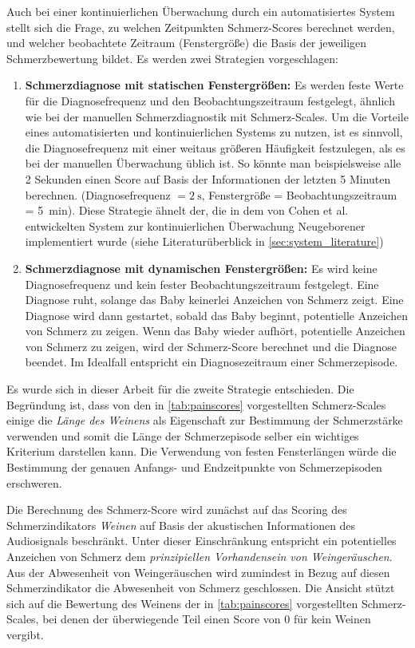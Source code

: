 Auch bei einer kontinuierlichen Überwachung durch ein automatisiertes System stellt sich die Frage, zu welchen Zeitpunkten Schmerz-Scores berechnet werden, und welcher beobachtete Zeitraum (\glqq Fenstergröße\grqq ) die Basis der jeweiligen Schmerzbewertung bildet. Es werden zwei Strategien vorgeschlagen:
\begin{enumerate}
\item \textbf{Schmerzdiagnose mit statischen Fenstergrößen: } Es werden feste Werte für die Diagnosefrequenz und den Beobachtungszeitraum festgelegt, ähnlich wie bei der manuellen Schmerzdiagnostik mit Schmerz-Scales. Um die Vorteile eines automatisierten und kontinuierlichen Systems zu nutzen, ist es sinnvoll, die Diagnosefrequenz mit einer weitaus größeren Häufigkeit festzulegen, als es bei der manuellen Überwachung üblich ist. So könnte man beispielsweise alle 2 Sekunden einen Score auf Basis der Informationen der letzten 5 Minuten berechnen. (Diagnosefrequenz $ = \SI{2}{\second}$, Fenstergröße = Beobachtungszeitraum = \SI{5}{\minute}). Diese Strategie ähnelt der, die in dem von Cohen et al. \cite{cohenCry} entwickelten System zur kontinuierlichen Überwachung Neugeborener implementiert wurde (siehe Literaturüberblick in \autoref{sec:system_literature})
\item \textbf{Schmerzdiagnose mit dynamischen Fenstergrößen: } Es wird keine Diagnosefrequenz und kein fester Beobachtungszeitraum festgelegt. Eine Diagnose ruht, solange das Baby keinerlei Anzeichen von Schmerz zeigt. Eine Diagnose wird dann gestartet, sobald das Baby beginnt, potentielle Anzeichen von Schmerz zu zeigen. Wenn das Baby wieder aufhört, potentielle Anzeichen von Schmerz zu zeigen, wird der Schmerz-Score berechnet und die Diagnose beendet. Im Idealfall entspricht ein Diagnosezeitraum einer Schmerzepisode.
\end{enumerate}

Es wurde sich in dieser Arbeit für die zweite Strategie entschieden. Die Begründung ist, dass von den in \autoref{tab:painscores} vorgestellten Schmerz-Scales einige die \emph{Länge des Weinens} als Eigenschaft zur Bestimmung der Schmerzstärke verwenden und somit die Länge der Schmerzepisode selber ein wichtiges Kriterium darstellen kann. Die Verwendung von festen Fensterlängen würde die Bestimmung der genauen Anfangs- und Endzeitpunkte von Schmerzepisoden erschweren.  

Die Berechnung des Schmerz-Score wird zunächst auf das Scoring des Schmerzindikators \emph{Weinen} auf Basis der akustischen Informationen des Audiosignals beschränkt. Unter dieser Einschränkung entspricht ein \glqq potentielles Anzeichen von Schmerz\grqq{} dem \emph{prinzipiellen Vorhandensein von Weingeräuschen}. Aus der Abwesenheit von Weingeräuschen wird zumindest in Bezug auf diesen Schmerzindikator die Abwesenheit von Schmerz geschlossen. Die Ansicht stützt sich auf die Bewertung des Weinens der in \autoref{tab:painscores} vorgestellten Schmerz-Scales, bei denen der überwiegende Teil einen Score von 0 für \glqq kein Weinen\grqq{} vergibt.

